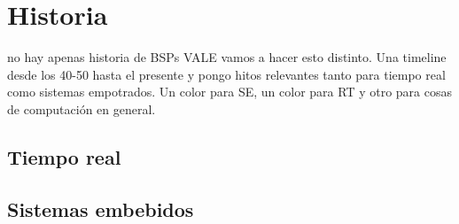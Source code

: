 %
%
%
%

\section{Historia}
no hay apenas historia de BSPs
VALE vamos a hacer esto distinto. Una timeline desde los 40-50 hasta el presente y pongo hitos relevantes tanto para tiempo real como sistemas empotrados. Un color para SE, un color para RT y otro para cosas de computación en general.

\subsection{Tiempo real}
\subsection{Sistemas embebidos}
